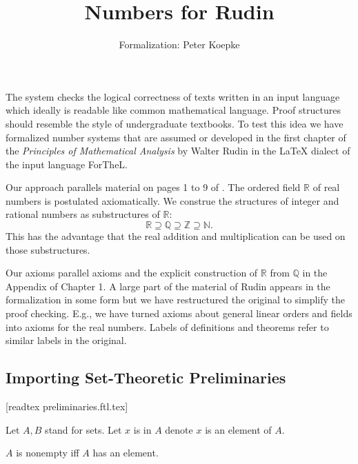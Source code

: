 \documentclass{article}
\begin{document}
\title{Numbers for Rudin}

\author{\Naproche{} Formalization: Peter Koepke}

\maketitle

The \Naproche{} system checks the logical correctness of texts 
written in an input language which ideally is readable 
like common mathematical language. Proof structures should resemble the 
style of undergraduate textbooks. To test this 
idea we have formalized number systems that are
assumed or developed in the first chapter of the 
{\it Principles of Mathematical Analysis} by Walter Rudin 
\cite{Rudin} in the {\LaTeX} dialect of the input language ForTheL.

Our approach parallels material 
on pages 1 to 9 of \cite{Rudin}. 
The ordered field $\mathbb{R}$ of real numbers 
is postulated axiomatically. We construe the structures of integer and 
rational numbers as substructures of $\mathbb{R}$:
$$\mathbb{R} \supseteq \mathbb{Q} \supseteq \mathbb{Z} 
\supseteq \mathbb{N}.$$
This has the advantage that the real addition and multiplication 
can be used on those substructures. 

Our axioms parallel axioms and the explicit construction of 
$\mathbb{R}$ from $\mathbb{Q}$ in the Appendix of Chapter 1.
A large part of the 
material of Rudin appears in the formalization in some form but 
we have restructured the original to simplify the proof 
checking. E.g., we have turned axioms about general 
linear orders and fields into axioms for the real numbers. 
Labels of definitions and theorems
refer to similar labels in the original.

\subsection{Importing Set-Theoretic Preliminaries}
\begin{forthel}
[timelimit 10]

[readtex preliminaries.ftl.tex]

Let $A,B$ stand for sets.
Let $x$ is in $A$ denote $x$ is an element of $A$.


\begin{definition}[1 3] $A$ is nonempty iff $A$ has an element.
\end{definition}

\end{forthel}
\end{document}
